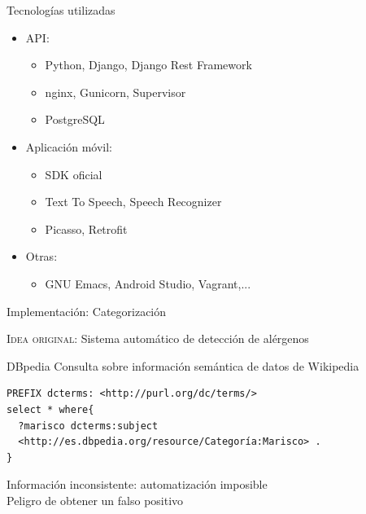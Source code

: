 \documentclass[10pt,xcolor=svgnames]{beamer}
\begin{document}
\begin{frame}{Tecnologías utilizadas}
  \begin{itemize}
  \item API:
    \begin{itemize}
    \item Python, Django, Django Rest Framework
    \item nginx, Gunicorn, Supervisor
    \item PostgreSQL
    \end{itemize}
  \item Aplicación móvil:
    \begin{itemize}
    \item SDK oficial
    \item Text To Speech, Speech Recognizer
    \item Picasso, Retrofit
    \end{itemize}
  \item Otras:
    \begin{itemize}
    \item GNU Emacs, Android Studio, Vagrant,...
    \end{itemize}    
  \end{itemize}
\end{frame}


\begin{frame}[fragile]{Implementación: Categorización}

  \begin{cambiarmargen}{-0.5cm}{-0.5cm}
    \textcolor{naranja}{\textsc{Idea original}}: Sistema automático de detección
    de alérgenos

    \begin{block}{DBpedia}
      Consulta sobre información semántica de datos de Wikipedia
    \end{block}

    
    \begin{verbatim}
PREFIX dcterms: <http://purl.org/dc/terms/>
select * where{
  ?marisco dcterms:subject
  <http://es.dbpedia.org/resource/Categoría:Marisco> .
}
    \end{verbatim}

    \vspace*{0.5cm}
    
    \then{} Información inconsistente: automatización imposible\\
    \then{} Peligro de obtener un falso positivo
  \end{cambiarmargen}
\end{frame}
\end{document}
